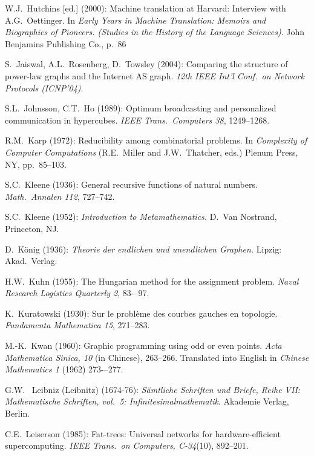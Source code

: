 \begin{thebibliography}{999}
W.J.~Hutchins [ed.] (2000):
Machine translation at Harvard: Interview with A.G.~Oettinger.
In {\it Early Years in Machine Translation: Memoirs and Biographies of
  Pioneers.  (Studies in the History of the Language Sciences)}.
John Benjamins Publishing Co., p.~86





S.~Jaiswal, A.L.~Rosenberg, D.~Towsley (2004):
Comparing the structure of power-law graphs and the Internet AS graph.
{\it 12th IEEE Int'l Conf.~on Network Protocols (ICNP'04)}.

S.L.~Johnsson, C.T.~Ho (1989):
Optimum broadcasting and personalized communication in hypercubes.
{\it IEEE Trans.~Computers 38}, 1249--1268.



R.M.~Karp (1972): Reducibility among combinatorial problems.  In {\it
Complexity of Computer Computations} (R.E.~Miller and J.W.~Thatcher,
eds.)  Plenum Press, NY, pp.~85--103.

S.C.~Kleene (1936): General recursive functions of natural numbers.
{\it Math.~Annalen 112}, 727--742.

S.C.~Kleene (1952):
{\it Introduction to Metamathematics.}
D.~Van Nostrand, Princeton, NJ.

D.~K\"onig (1936):
{\it Theorie der endlichen und unendlichen Graphen.}  Lipzig: Akad.~Verlag.

H.W.~Kuhn (1955): The Hungarian method for the assignment problem.
{\it Naval Research Logistics Quarterly 2}, 83-–97.

K.~Kuratowski (1930):
Sur le probl\`{e}me des courbes gauches en topologie.
{\it Fundamenta Mathematica 15}, 271--283. 

M.-K.~Kwan (1960): Graphic programming using odd or even points.
{\it Acta Mathematica Sinica, 10} (in Chinese), 263--266.  Translated
into English in {\it Chinese Mathematics 1} (1962) 273-–277.



G.W.~ Leibniz (Leibnitz) (1674-76):
{\it S\"{a}mtliche Schriften und Briefe, Reihe VII: Mathematische
  Schriften, vol.~5: Infinitesimalmathematik}.
Akademie Verlag, Berlin.

C.E.~Leiserson (1985):
Fat-trees: Universal networks for hardware-efficient supercomputing.
{\it IEEE Trans.~on Computers, C-34}(10), 892--201.


\end{thebibliography}
